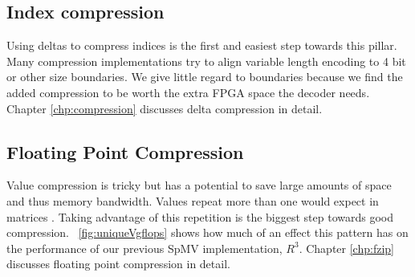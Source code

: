 \subsection{Index compression}
\par Using deltas to compress indices is the first and easiest step towards this pillar. Many compression implementations try to align variable length encoding to 4 bit or other size boundaries. We give little regard to boundaries because we find the added compression to be worth the extra FPGA space the decoder needs. Chapter \ref{chp:compression} discusses delta compression in detail.
%
\subsection{Floating Point Compression}
\par Value compression is tricky but has a potential to save large amounts of space and thus memory bandwidth. Values repeat more than one would expect in matrices \cite{}. Taking advantage of this repetition is the biggest step towards good compression. \figurename~\ref{fig:uniqueVgflops} shows how much of an effect this pattern has on the performance of our previous SpMV implementation, $R^3$. Chapter \ref{chp:fzip} discusses floating point compression in detail.

